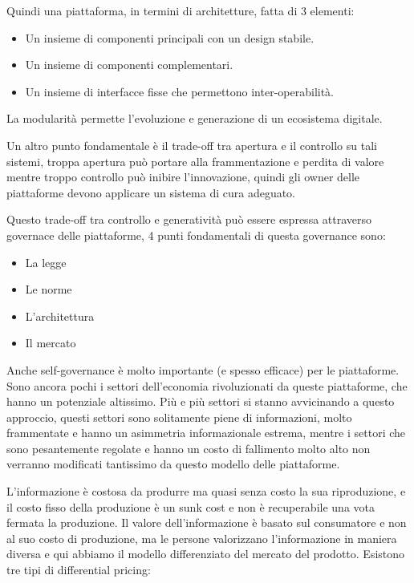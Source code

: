 \documentclass[a4page, 11pt]{article}
\begin{document}
Quindi una piattaforma, in termini di architetture, fatta di 3 elementi:

\begin{itemize}
	 
	\item
	Un insieme di componenti principali con un design stabile.
	\item
	Un insieme di componenti complementari.
	\item
	Un insieme di interfacce fisse che permettono inter-operabilità.
\end{itemize}

La modularità permette l'evoluzione e generazione di un ecosistema
digitale.

Un altro punto fondamentale è il trade-off tra apertura e il controllo
su tali sistemi, troppa apertura può portare alla frammentazione e
perdita di valore mentre troppo controllo può inibire l'innovazione,
quindi gli owner delle piattaforme devono applicare un sistema di cura
adeguato.

Questo trade-off tra controllo e generatività può essere espressa
attraverso governace delle piattaforme, 4 punti fondamentali di questa
governance sono:

\begin{itemize}
	 
	\item
	La legge
	\item
	Le norme
	\item
	L'architettura
	\item
	Il mercato
\end{itemize}

Anche self-governance è molto importante (e spesso efficace) per le
piattaforme. Sono ancora pochi i settori dell'economia rivoluzionati da
queste piattaforme, che hanno un potenziale altissimo. Più e più settori
si stanno avvicinando a questo approccio, questi settori sono
solitamente piene di informazioni, molto frammentate e hanno un
asimmetria informazionale estrema, mentre i settori che sono
pesantemente regolate e hanno un costo di fallimento molto alto non
verranno modificati tantissimo da questo modello delle piattaforme.

L'informazione è costosa da produrre ma quasi senza costo la sua
riproduzione, e il costo fisso della produzione è un sunk cost e non è
recuperabile una vota fermata la produzione. Il valore dell'informazione
è basato sul consumatore e non al suo costo di produzione, ma le persone
valorizzano l'informazione in maniera diversa e qui abbiamo il modello
differenziato del mercato del prodotto. Esistono tre tipi di
differential pricing:
\end{document}
